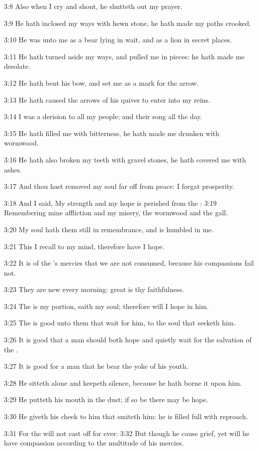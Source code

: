 3:8 Also when I cry and shout, he shutteth out my prayer.

3:9 He hath inclosed my ways with hewn stone, he hath made my paths crooked.

3:10 He was unto me as a bear lying in wait, and as a lion in secret places.

3:11 He hath turned aside my ways, and pulled me in pieces: he hath made me desolate.

3:12 He hath bent his bow, and set me as a mark for the arrow.

3:13 He hath caused the arrows of his quiver to enter into my reins.

3:14 I was a derision to all my people; and their song all the day.

3:15 He hath filled me with bitterness, he hath made me drunken with wormwood.

3:16 He hath also broken my teeth with gravel stones, he hath covered me with ashes.

3:17 And thou hast removed my soul far off from peace: I forgat prosperity.

3:18 And I said, My strength and my hope is perished from the \LORD: 3:19 Remembering mine affliction and my misery, the wormwood and the gall.

3:20 My soul hath them still in remembrance, and is humbled in me.

3:21 This I recall to my mind, therefore have I hope.

3:22 It is of the \LORD's mercies that we are not consumed, because his compassions fail not.

3:23 They are new every morning: great is thy faithfulness.

3:24 The \LORD is my portion, saith my soul; therefore will I hope in him.

3:25 The \LORD is good unto them that wait for him, to the soul that seeketh him.

3:26 It is good that a man should both hope and quietly wait for the salvation of the \LORD.

3:27 It is good for a man that he bear the yoke of his youth.

3:28 He sitteth alone and keepeth silence, because he hath borne it upon him.

3:29 He putteth his mouth in the dust; if so be there may be hope.

3:30 He giveth his cheek to him that smiteth him: he is filled full with reproach.

3:31 For the \LORD will not cast off for ever: 3:32 But though he cause grief, yet will he have compassion according to the multitude of his mercies.

